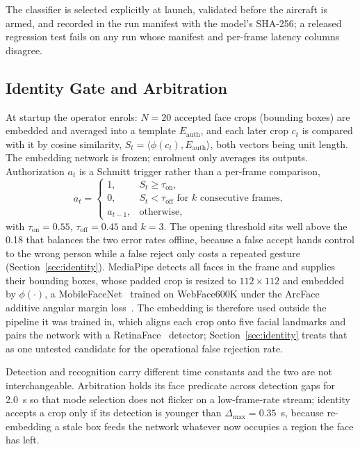 \documentclass[conference]{IEEEtran}
\begin{document}
The classifier is selected explicitly at launch, validated before the aircraft
is armed, and recorded in the run manifest with the model's SHA-256; a released
regression test fails on any run whose manifest and per-frame latency columns
disagree.

\subsection{Identity Gate and Arbitration}

At startup the operator enrols: $N=20$ accepted face crops (bounding boxes) are embedded and averaged
into a template $E_{\mathrm{auth}}$, and each later crop $c_t$ is compared with it by cosine similarity,
$S_t=\langle \phi(c_t),E_{\mathrm{auth}}\rangle$, both vectors being unit length.
The embedding network is frozen; enrolment only averages its outputs.
Authorization $a_t$ is a Schmitt trigger rather than a per-frame comparison,
\begin{equation}
a_t=
\begin{cases}
1, & S_t\ge\tau_{\mathrm{on}},\\
0, & S_t<\tau_{\mathrm{off}} \text{ for } k \text{ consecutive frames},\\
a_{t-1}, & \text{otherwise},
\end{cases}
\label{eq:gate}
\end{equation}
with $\tau_{\mathrm{on}}=0.55$, $\tau_{\mathrm{off}}=0.45$ and $k=3$.
The opening threshold sits well above the 0.18 that balances the two error rates
offline, because a false accept hands control to the wrong person while a false
reject only costs a repeated gesture (Section~\ref{sec:identity}).
MediaPipe detects all faces in the frame and supplies their bounding boxes, whose padded crop is resized to
$112\times112$ and embedded by $\phi(\cdot)$, a
MobileFaceNet~\cite{chen2018mobilefacenets} trained on WebFace600K under the
ArcFace additive angular margin loss~\cite{deng2019}.
The embedding is therefore used outside the pipeline it was trained in, which
aligns each crop onto five facial landmarks and pairs the network with a
RetinaFace~\cite{deng2020retinaface} detector; Section~\ref{sec:identity} treats that as one untested
candidate for the operational false rejection rate.

Detection and recognition carry different time constants and the two are not
interchangeable.
Arbitration holds its face predicate across detection gaps for 2.0~s so that
mode selection does not flicker on a low-frame-rate stream; identity accepts a
crop only if its detection is younger than $\Delta_{\max}=0.35$~s, because
re-embedding a stale box feeds the network whatever now occupies a region the
face has left.
\end{document}
